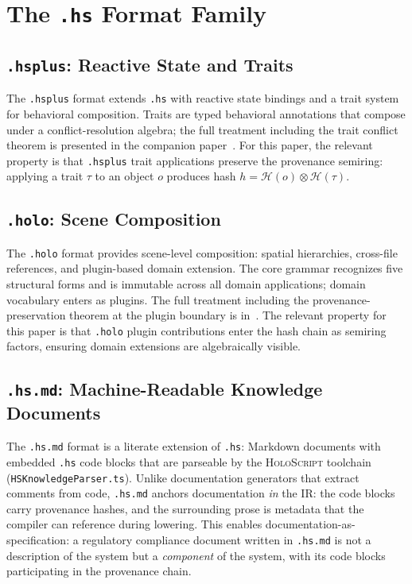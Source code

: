 \documentclass[sigconf,nonacm]{acmart}
\newcommand{\holoscript}{\textsc{HoloScript}}
\newcommand{\hscore}{\texttt{.hs}}
\newcommand{\hsplus}{\texttt{.hsplus}}
\newcommand{\holo}{\texttt{.holo}}
\newcommand{\hsmd}{\texttt{.hs.md}}
\newcommand{\hashfn}{\mathcal{H}}
\newcommand{\tropmult}{\otimes}
\begin{document}
\section{The \hscore{} Format Family}
\label{sec:family}

\subsection{\hsplus{}: Reactive State and Traits}
The \hsplus{} format extends \hscore{} with reactive state
bindings and a trait system for behavioral composition.
Traits are typed behavioral annotations that compose under
a conflict-resolution algebra; the full treatment including
the trait conflict theorem is presented in the companion
paper~\cite{paper-11-hsplus-ecoop2027}. For this paper,
the relevant property is that \hsplus{} trait applications
preserve the provenance semiring: applying a trait $\tau$
to an object $o$ produces hash
$h = \hashfn(o) \tropmult \hashfn(\tau)$.

\subsection{\holo{}: Scene Composition}
The \holo{} format provides scene-level composition: spatial
hierarchies, cross-file references, and plugin-based domain
extension. The core grammar recognizes five structural forms
and is immutable across all domain applications; domain
vocabulary enters as plugins. The full treatment including
the provenance-preservation theorem at the plugin boundary
is in~\cite{paper-12-holo-i3d2027}. The relevant property
for this paper is that \holo{} plugin contributions enter
the hash chain as semiring factors, ensuring domain
extensions are algebraically visible.

\subsection{\hsmd{}: Machine-Readable Knowledge Documents}
\label{sec:hsmd}
The \hsmd{} format is a literate extension of \hscore{}:
Markdown documents with embedded \hscore{} code blocks
that are parseable by the \holoscript{} toolchain
(\texttt{HSKnowledgeParser.ts}). Unlike documentation
generators that extract comments from code, \hsmd{}
anchors documentation \emph{in} the IR: the code blocks
carry provenance hashes, and the surrounding prose is
metadata that the compiler can reference during lowering.
This enables documentation-as-specification: a regulatory
compliance document written in \hsmd{} is not a description
of the system but a \emph{component} of the system,
with its code blocks participating in the provenance chain.
\end{document}
